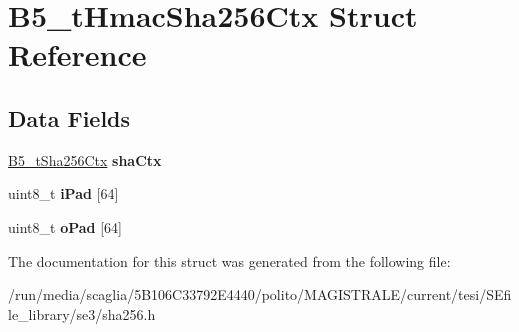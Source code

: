 \hypertarget{struct_b5__t_hmac_sha256_ctx}{\section{B5\-\_\-t\-Hmac\-Sha256\-Ctx Struct Reference}
\label{struct_b5__t_hmac_sha256_ctx}
}
\subsection*{Data Fields}
\begin{DoxyCompactItemize}
\item 
\hypertarget{struct_b5__t_hmac_sha256_ctx_a90517824f7b08087359ee98eff1a4c69}{\hyperlink{struct_b5__t_sha256_ctx}{B5\-\_\-t\-Sha256\-Ctx} {\bfseries sha\-Ctx}}\label{struct_b5__t_hmac_sha256_ctx_a90517824f7b08087359ee98eff1a4c69}

\item 
\hypertarget{struct_b5__t_hmac_sha256_ctx_aa913d516ab08a0843a4f88cb836dea7d}{uint8\-\_\-t {\bfseries i\-Pad} \mbox{[}64\mbox{]}}\label{struct_b5__t_hmac_sha256_ctx_aa913d516ab08a0843a4f88cb836dea7d}

\item 
\hypertarget{struct_b5__t_hmac_sha256_ctx_a4acdef41ccf7885fc01fa74a2a5de4a1}{uint8\-\_\-t {\bfseries o\-Pad} \mbox{[}64\mbox{]}}\label{struct_b5__t_hmac_sha256_ctx_a4acdef41ccf7885fc01fa74a2a5de4a1}

\end{DoxyCompactItemize}


The documentation for this struct was generated from the following file\-:\begin{DoxyCompactItemize}
\item 
/run/media/scaglia/5\-B106\-C33792\-E4440/polito/\-M\-A\-G\-I\-S\-T\-R\-A\-L\-E/current/tesi/\-S\-Efile\-\_\-library/se3/sha256.\-h\end{DoxyCompactItemize}
